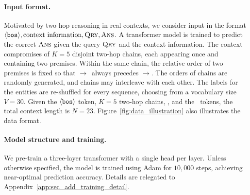 \paragraph{Input format.}
Motivated by two-hop reasoning in real contexts, we consider input in the format $\langle\texttt{bos}\rangle, \text{context information}, \textsc{Qry}, \textsc{Ans}$. A transformer model is trained to predict the correct $\textsc{Ans}$ given the query $\textsc{Qry}$ and the context information. The context compromises of $K=5$ disjoint two-hop chains, each appearing once and containing two premises. Within the same chain, the relative order of two premises is fixed so that \Src$\to$\brga~always precedes \brgb$\to$\Ed. The orders of chains are randomly generated, and chains may interleave with each other. The labels for the entities are re-shuffled for every sequence, choosing from a vocabulary size $V=30$. Given the $\langle\texttt{bos}\rangle$ token, $K=5$ two-hop chains, \query, and the \answer~tokens, the total context length is $N=23$. Figure~\ref{fig:data_illustration} also illustrates the data format. 

\paragraph{Model structure and training.} We pre-train a three-layer transformer with a single head per layer. Unless otherwise specified, the model is trained using Adam for $10,000$ steps, achieving near-optimal prediction accuracy. Details are relegated to Appendix~\ref{app:sec_add_training_detail}.










